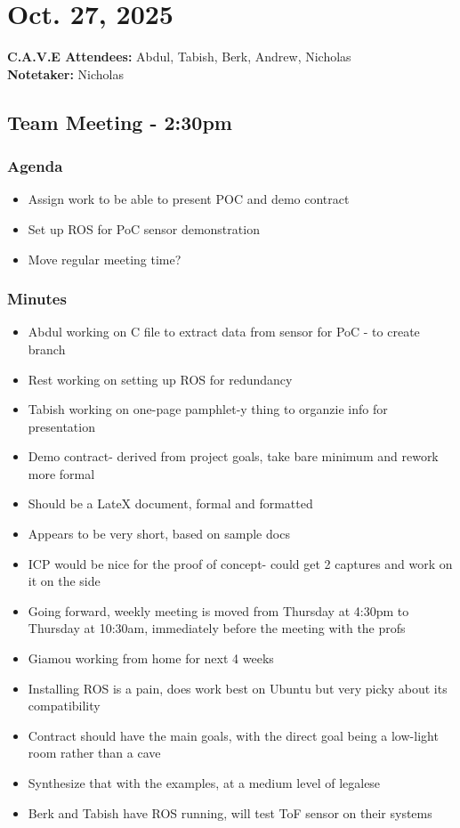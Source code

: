 	\pagebreak
	\section*{Oct. 27, 2025}

	\textbf{C.A.V.E Attendees:} Abdul, Tabish, Berk, Andrew, Nicholas\\
	\textbf{Notetaker:} Nicholas

	\subsection*{Team Meeting - 2:30pm}
		\subsubsection*{Agenda}
			\begin{itemize}
				\item Assign work to be able to present POC and demo contract
				\item Set up ROS for PoC sensor demonstration
				\item Move regular meeting time?
			\end{itemize}

		\subsubsection*{Minutes}
			\begin{itemize}
				\item Abdul working on C file to extract data from sensor for PoC - to create branch
				\item Rest working on setting up ROS for redundancy
				\item Tabish working on one-page pamphlet-y thing to organzie info for presentation
				\item Demo contract- derived from project goals, take bare minimum and rework more formal
				\item Should be a LateX document, formal and formatted
				\item Appears to be very short, based on sample docs
				\item ICP would be nice for the proof of concept- could get 2 captures and work on it on the side
				\item Going forward, weekly meeting is moved from Thursday at 4:30pm to Thursday at 10:30am, immediately before the meeting with the profs
				\item Giamou working from home for next 4 weeks
				\item Installing ROS is a pain, does work best on Ubuntu but very picky about its compatibility
				\item Contract should have the main goals, with the direct goal being a low-light room rather than a cave
				\item Synthesize that with the examples, at a medium level of legalese
				\item Berk and Tabish have ROS running, will test ToF sensor on their systems
			\end{itemize}

